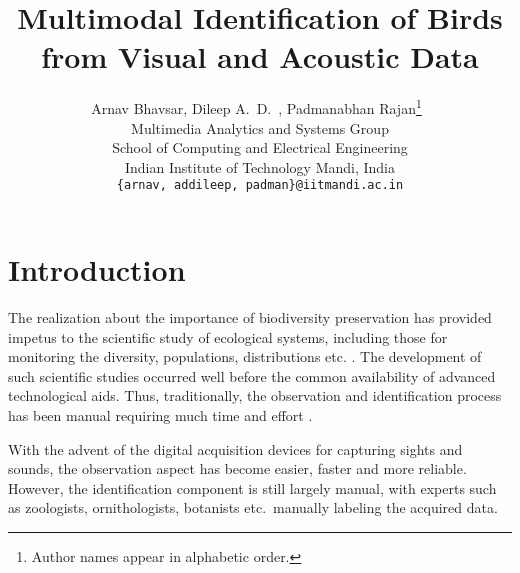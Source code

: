 \documentclass{article}
\begin{document}
\title{Multimodal Identification of Birds from Visual and Acoustic Data}
\author{Arnav Bhavsar, Dileep A.~D.~, Padmanabhan Rajan\footnote{Author names
appear in alphabetic order.}\  \\Multimedia Analytics and Systems Group \\ 
School of Computing and Electrical Engineering\\
Indian Institute of Technology Mandi, India\\
\texttt{\{arnav, addileep, padman\}@iitmandi.ac.in}}

\date{}
\maketitle

\section{Introduction}






The realization about the importance of biodiversity preservation has provided
impetus to the scientific study of ecological systems, including those for
monitoring the diversity, populations, distributions etc.
\cite{monitor1,monitor2,monitor3,monitor4}. 
The development of such scientific studies occurred well before the common
availability of advanced technological aids. Thus, traditionally, the
observation and identification process has been manual requiring much time and
effort \cite{monitor4,human1,human2}. 

With the advent of the digital acquisition devices for capturing sights and
sounds, the observation aspect has become easier, faster and more reliable.
However, the identification component is still largely manual, with experts such
as zoologists, ornithologists, botanists etc.~manually labeling the acquired data. 
\end{document}
